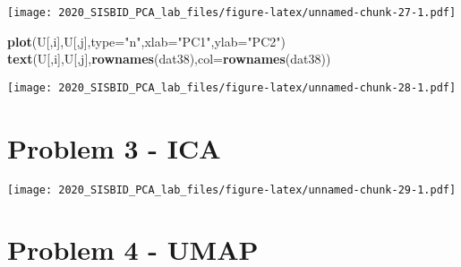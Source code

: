 \documentclass[
]{article}
\newenvironment{Shaded}{\begin{snugshade}}{\end{snugshade}}
\newcommand{\CommentTok}[1]{\textcolor[rgb]{0.56,0.35,0.01}{\textit{#1}}}
\newcommand{\ControlFlowTok}[1]{\textcolor[rgb]{0.13,0.29,0.53}{\textbf{#1}}}
\newcommand{\DataTypeTok}[1]{\textcolor[rgb]{0.13,0.29,0.53}{#1}}
\newcommand{\DecValTok}[1]{\textcolor[rgb]{0.00,0.00,0.81}{#1}}
\newcommand{\KeywordTok}[1]{\textcolor[rgb]{0.13,0.29,0.53}{\textbf{#1}}}
\newcommand{\NormalTok}[1]{#1}
\newcommand{\OperatorTok}[1]{\textcolor[rgb]{0.81,0.36,0.00}{\textbf{#1}}}
\newcommand{\StringTok}[1]{\textcolor[rgb]{0.31,0.60,0.02}{#1}}
\begin{document}
\texttt{[image: 2020\_SISBID\_PCA\_lab\_files/figure-latex/unnamed-chunk-27-1.pdf]}

\begin{Shaded}
\begin{Highlighting}[]
\KeywordTok{plot}\NormalTok{(U[,i],U[,j],}\DataTypeTok{type=}\StringTok{"n"}\NormalTok{,}\DataTypeTok{xlab=}\StringTok{"PC1"}\NormalTok{,}\DataTypeTok{ylab=}\StringTok{"PC2"}\NormalTok{)}
\KeywordTok{text}\NormalTok{(U[,i],U[,j],}\KeywordTok{rownames}\NormalTok{(dat38),}\DataTypeTok{col=}\KeywordTok{rownames}\NormalTok{(dat38))}
\end{Highlighting}
\end{Shaded}

\texttt{[image: 2020\_SISBID\_PCA\_lab\_files/figure-latex/unnamed-chunk-28-1.pdf]}

\hypertarget{problem-3---ica}{%
\section{Problem 3 - ICA}\label{problem-3---ica}}

\begin{Shaded}
\end{Shaded}

\texttt{[image: 2020\_SISBID\_PCA\_lab\_files/figure-latex/unnamed-chunk-29-1.pdf]}

\hypertarget{problem-4---umap-1}{%
\section{Problem 4 - UMAP}\label{problem-4---umap-1}}
\end{document}
